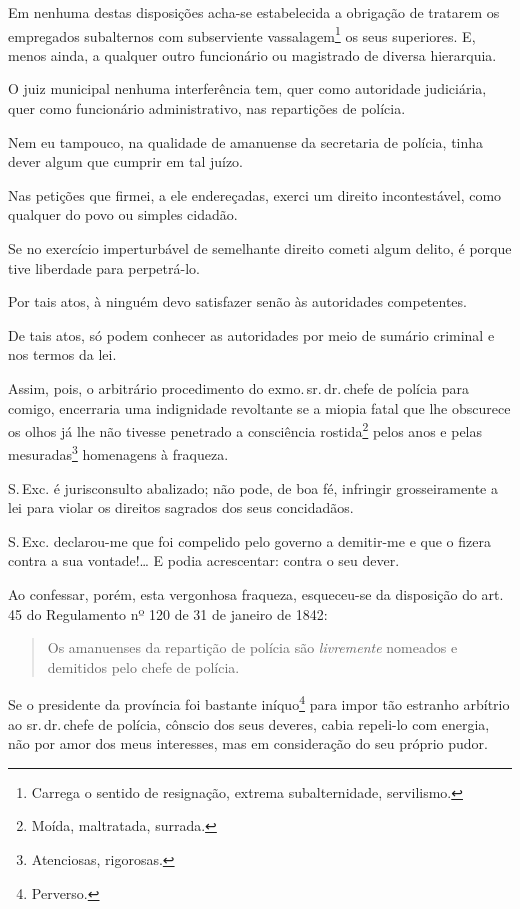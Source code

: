 Em nenhuma destas disposições acha-se estabelecida a obrigação de
tratarem os empregados subalternos com subserviente
vassalagem\footnote{Carrega o sentido de resignação, extrema
  subalternidade, servilismo.} os seus superiores. E, menos ainda, a
qualquer outro funcionário ou magistrado de diversa hierarquia.

O juiz municipal nenhuma interferência tem, quer como autoridade
judiciária, quer como funcionário administrativo, nas repartições de
polícia.

Nem eu tampouco, na qualidade de amanuense da secretaria de polícia,
tinha dever algum que cumprir em tal juízo.

Nas petições que firmei, a ele endereçadas, exerci um direito
incontestável, como qualquer do povo ou simples cidadão.

Se no exercício imperturbável de semelhante direito cometi algum delito,
é porque tive liberdade para perpetrá-lo.

Por tais atos, à ninguém devo satisfazer senão às autoridades
competentes.

De tais atos, só podem conhecer as autoridades por meio de sumário
criminal e nos termos da lei.

Assim, pois, o arbitrário procedimento do exmo.\,sr.\,dr.\,chefe de polícia
para comigo, encerraria uma indignidade revoltante se a miopia fatal que
lhe obscurece os olhos já lhe não tivesse penetrado a consciência
rostida\footnote{Moída, maltratada, surrada.} pelos anos e pelas
mesuradas\footnote{Atenciosas, rigorosas.} homenagens à fraqueza.

S.\,Exc. é jurisconsulto abalizado; não pode, de boa fé, infringir
grosseiramente a lei para violar os direitos sagrados dos seus
concidadãos.

S.\,Exc. declarou-me que foi compelido pelo governo a demitir-me e que o
fizera contra a sua vontade!\ldots{} E podia acrescentar: contra o seu dever.

Ao confessar, porém, esta vergonhosa fraqueza, esqueceu-se da disposição
do art. 45 do Regulamento nº 120 de 31 de janeiro de 1842:

\begin{quote}
Os amanuenses da repartição de polícia são \emph{livremente} nomeados e
demitidos pelo chefe de polícia.
\end{quote}

Se o presidente da província foi bastante iníquo\footnote{Perverso.}
para impor tão estranho arbítrio ao sr.\,dr.\,chefe de polícia, cônscio
dos seus deveres, cabia repeli-lo com energia, não por amor dos meus
interesses, mas em consideração do seu próprio pudor.


